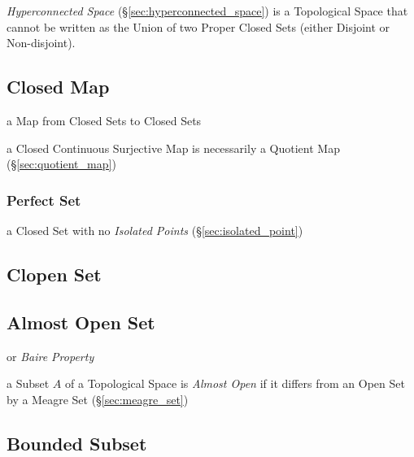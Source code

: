 \fist \emph{Hyperconnected Space} (\S\ref{sec:hyperconnected_space}) is a
Topological Space that cannot be written as the Union of two Proper Closed Sets
(either Disjoint or Non-disjoint).



\subsection{Closed Map}\label{sec:closed_map}

a Map from Closed Sets to Closed Sets

a Closed Continuous Surjective Map is necessarily a Quotient Map
(\S\ref{sec:quotient_map})



\subsubsection{Perfect Set}\label{sec:perfect_set}

a Closed Set with no \emph{Isolated Points}
(\S\ref{sec:isolated_point})



\subsection{Clopen Set}\label{sec:clopen_set}

\subsection{Almost Open Set}\label{sec:almost_open}

or \emph{Baire Property}

a Subset $A$ of a Topological Space is \emph{Almost Open} if it differs from an
Open Set by a Meagre Set (\S\ref{sec:meagre_set})



\subsection{Bounded Subset}\label{sec:bounded_subset}

